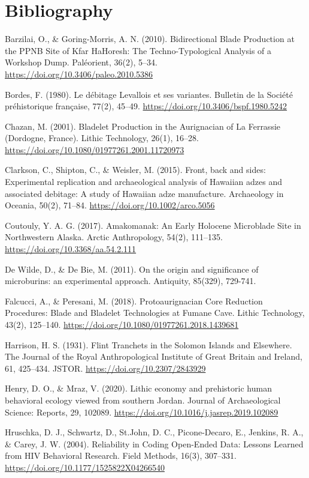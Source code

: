 \documentclass[
]{article}
\begin{document}
\hypertarget{bibliography}{%
\section{Bibliography}\label{bibliography}}

Barzilai, O., \& Goring-Morris, A. N. (2010). Bidirectional Blade
Production at the PPNB Site of Kfar HaHoresh: The Techno-Typological
Analysis of a Workshop Dump. Paléorient, 36(2), 5--34.
\url{https://doi.org/10.3406/paleo.2010.5386}

Bordes, F. (1980). Le débitage Levallois et ses variantes. Bulletin de
la Société préhistorique française, 77(2), 45--49.
\url{https://doi.org/10.3406/bspf.1980.5242}

Chazan, M. (2001). Bladelet Production in the Aurignacian of La
Ferrassie (Dordogne, France). Lithic Technology, 26(1), 16--28.
\url{https://doi.org/10.1080/01977261.2001.11720973}

Clarkson, C., Shipton, C., \& Weisler, M. (2015). Front, back and sides:
Experimental replication and archaeological analysis of Hawaiian adzes
and associated debitage: A study of Hawaiian adze manufacture.
Archaeology in Oceania, 50(2), 71--84.
\url{https://doi.org/10.1002/arco.5056}

Coutouly, Y. A. G. (2017). Amakomanak: An Early Holocene Microblade Site
in Northwestern Alaska. Arctic Anthropology, 54(2), 111--135.
\url{https://doi.org/10.3368/aa.54.2.111}

De Wilde, D., \& De Bie, M. (2011). On the origin and significance of
microburins: an experimental approach. Antiquity, 85(329), 729-741.

Falcucci, A., \& Peresani, M. (2018). Protoaurignacian Core Reduction
Procedures: Blade and Bladelet Technologies at Fumane Cave. Lithic
Technology, 43(2), 125--140.
\url{https://doi.org/10.1080/01977261.2018.1439681}

Harrison, H. S. (1931). Flint Tranchets in the Solomon Islands and
Elsewhere. The Journal of the Royal Anthropological Institute of Great
Britain and Ireland, 61, 425--434. JSTOR.
\url{https://doi.org/10.2307/2843929}

Henry, D. O., \& Mraz, V. (2020). Lithic economy and prehistoric human
behavioral ecology viewed from southern Jordan. Journal of
Archaeological Science: Reports, 29, 102089.
\url{https://doi.org/10.1016/j.jasrep.2019.102089}

Hruschka, D. J., Schwartz, D., St.John, D. C., Picone-Decaro, E.,
Jenkins, R. A., \& Carey, J. W. (2004). Reliability in Coding Open-Ended
Data: Lessons Learned from HIV Behavioral Research. Field Methods,
16(3), 307--331. \url{https://doi.org/10.1177/1525822X04266540}
\end{document}
